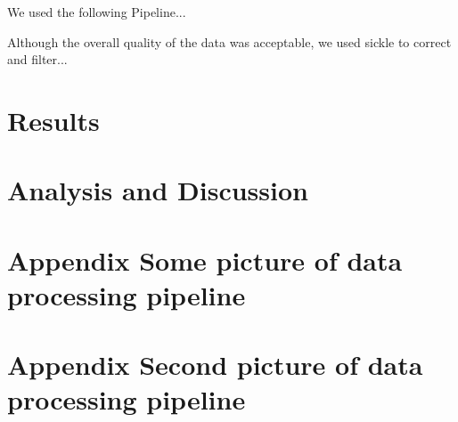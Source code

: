 \documentclass[]{article}
\begin{document}
We used the following Pipeline...

Although the overall quality of the data was acceptable, we used sickle to correct and filter...

\section{Results}




\section{Analysis and Discussion}

\pagebreak
\appendix
\section{Appendix Some picture of data processing pipeline}
\section{Appendix Second picture of data processing pipeline}
\end{document}
